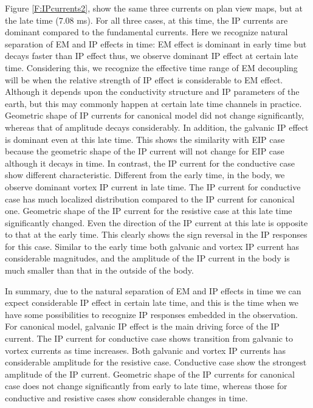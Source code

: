 \documentclass[a4paper, 11pt]{article}
\begin{document}
Figure \ref{F:IPcurrents2}, show the same three currents on plan view maps, but at the late time (7.08 ms). For all three cases, at this time, the IP currents are dominant compared to the fundamental currents. Here we recognize natural separation of EM and IP effects in time: EM effect is dominant in early time but decays faster than IP effect thus, we observe dominant IP effect at certain late time. Considering this, we recognize the effective time range of EM decoupling will be when the relative strength of IP effect is considerable to EM effect. Although it depends upon the conductivity structure and IP parameters of the earth, but this may commonly happen at certain late time channels in practice. Geometric shape of IP currents for canonical model did not change significantly, whereas that of amplitude decays considerably. In addition, the galvanic IP effect is dominant even at this late time. This shows the similarity with EIP case because the geometric  shape of the IP current will not change for EIP case although it decays in time. In contrast, the IP current for the conductive case show different characteristic. Different from the early time, in the body, we observe dominant vortex IP current in late time. The IP current for conductive case has much localized distribution compared to the IP current for canonical one. Geometric shape of the IP current for the resistive case at this late time significantly changed. Even the direction of the IP current at this late is opposite to that at the early time. This clearly shows the sign reversal in the IP responses for this case. Similar to the early time both galvanic and vortex IP current has considerable magnitudes, and the amplitude of the IP current in the body is much smaller than that in the outside of the body. 

In summary, due to the natural separation of EM and IP effects in time we can expect considerable IP effect in certain late time, and this is the time when we have some possibilities to recognize IP responses embedded in the observation. For canonical model, galvanic IP effect is the main driving force of the IP current. The IP current for conductive case shows transition from galvanic to vortex currents as time increases. Both galvanic and vortex IP currents has considerable amplitude for the resistive case. Conductive case show the strongest amplitude of the IP current. Geometric shape of the IP currents for canonical case does not change significantly from early to late time, whereas those for conductive and resistive cases show considerable changes in time. 
\end{document}
